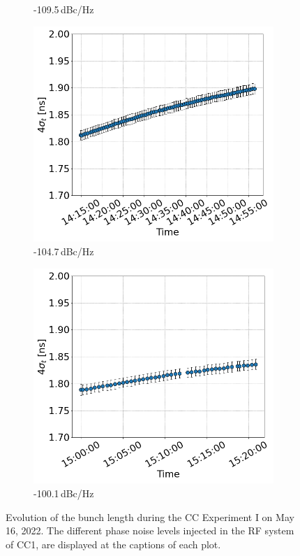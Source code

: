 \begin{figure}[htp]
\begin{subfigure}{.45\textwidth}
         \caption{-109.5\,dBc/Hz}
     \end{subfigure}
     \begin{subfigure}{.45\textwidth}
         \centering
         \includegraphics[width=.95\linewidth]{images/app_c/bunch_length_COAST_04.png}  
         \caption{-104.7\,dBc/Hz}
     \end{subfigure}
     \begin{subfigure}{.45\textwidth}
             \centering
             \includegraphics[width=.95\linewidth]{images/app_c/bunch_length_COAST_05.png}  
             \caption{-100.1\,dBc/Hz}
     \end{subfigure}
     \caption{Evolution of the bunch length during the CC Experiment I on May 16, 2022. The different phase noise levels injected in the RF system of CC1, are displayed at the captions of each plot.}
     \label{fig:cc_md_2022_overview_plots_noise_scan_bunch_length}
  \end{figure}
  
